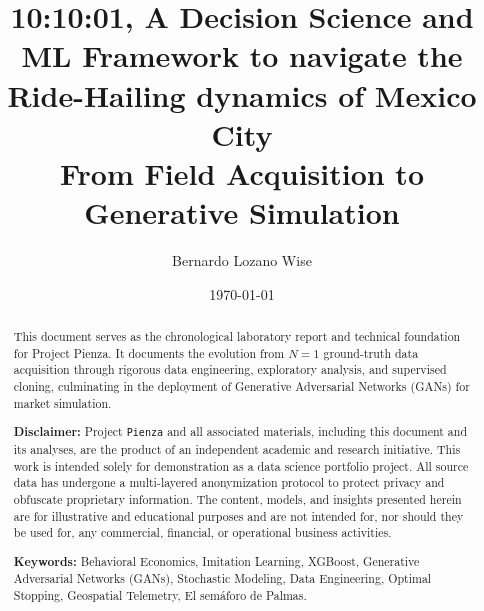 \documentclass[10pt, letterpaper]{article}
\title{\textbf{10:10:01, A Decision Science and ML Framework to navigate the Ride-Hailing dynamics of Mexico City}\\ \large From Field Acquisition to Generative Simulation}
\author{Bernardo Lozano Wise}
\date{\today}
\begin{document}
\maketitle

\begin{abstract}
\noindent This document serves as the chronological laboratory report and technical foundation for Project Pienza. It documents the evolution from $N=1$ ground-truth data acquisition through rigorous data engineering, exploratory analysis, and supervised cloning, culminating in the deployment of Generative Adversarial Networks (GANs) for market simulation.

\vspace{0.4cm}
\noindent \textbf{Disclaimer:} Project \texttt{Pienza} and all associated materials, including this document and its analyses, are the product of an independent academic and research initiative. This work is intended solely for demonstration as a data science portfolio project. All source data has undergone a multi-layered anonymization protocol to protect privacy and obfuscate proprietary information. The content, models, and insights presented herein are for illustrative and educational purposes and are not intended for, nor should they be used for, any commercial, financial, or operational business activities.

\vspace{0.4cm}
\noindent \textbf{Keywords:} Behavioral Economics, Imitation Learning, XGBoost, Generative Adversarial Networks (GANs), Stochastic Modeling, Data Engineering, Optimal Stopping, Geospatial Telemetry, El semáforo de Palmas.
\end{abstract}

\tableofcontents
\newpage



\newpage





\newpage









\newpage






\newpage


\newpage


\newpage


\newpage


\newpage


\newpage


\newpage
\appendix %

\end{document}

